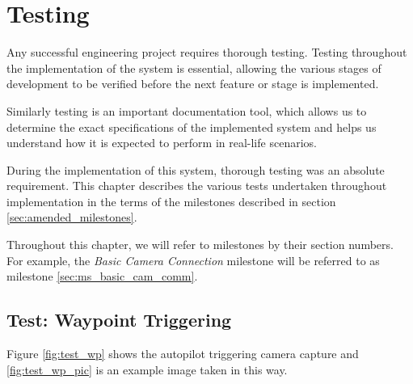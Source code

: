 \chapter{Testing}
Any successful engineering project requires thorough testing. Testing throughout
the implementation of the system is essential, allowing the various stages of 
development to be verified before the next feature or stage is implemented.

Similarly testing is an important documentation tool, which allows us to determine the
exact specifications of the implemented system and helps us understand how it is 
expected to perform in real-life scenarios.

During the implementation of this system, thorough testing was an absolute
requirement. This chapter describes the various tests undertaken
throughout implementation in the terms of the milestones described in section
\ref{sec:amended_milestones}. 

Throughout this chapter, we will refer to milestones by their section numbers.
For example, the \emph{Basic Camera Connection} milestone will be referred
to as milestone \ref{sec:ms_basic_cam_comm}.









\section{Test: Waypoint Triggering}
\label{sec:test_wp_trig}
Figure \ref{fig:test_wp} shows the autopilot triggering camera capture and \ref{fig:test_wp_pic} is an example image taken in this way.

